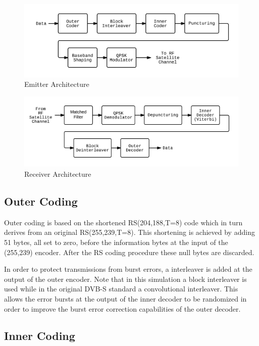 \documentclass[paper=a4, fontsize=11pt]{scrartcl}	%
\numberwithin{equation}{section}		%
\numberwithin{figure}{section}			%
\numberwithin{table}{section}			%
\begin{document}
\begin{figure}[htb]
\centering
\includegraphics[scale=0.25]{EmitterL.png}
\caption{Emitter Architecture}\label{fig:TxArch}
\end{figure}

\begin{figure}[htb]
\centering
\includegraphics[scale=0.25]{ReceiverL.png}
\caption{Receiver Architecture}\label{fig:RxArch}
\end{figure}


\subsection{Outer Coding}

Outer coding is based on the shortened RS(204,188,T=8) code which in turn derives from an original RS(255,239,T=8). This shortening is achieved by adding 51 bytes, all set to zero, before the information bytes at the input of the (255,239) encoder. After the RS coding procedure these null bytes are discarded.

In order to protect transmissions from burst errors, a interleaver is added at the output of the outer encoder. Note that in this simulation a block interleaver is used while in the original DVB-S standard a convolutional interleaver. This allows the error bursts at the output of the inner decoder to be randomized in order to improve the burst error correction capabilities of the outer decoder.

\subsection{Inner Coding}
\end{document}
